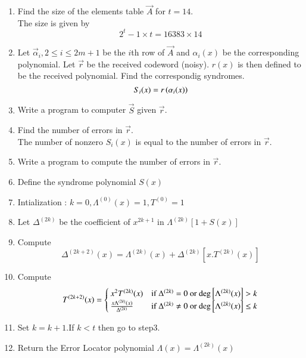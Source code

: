 \documentclass[journal,12pt,twocolumn]{IEEEtran}
\renewcommand\thesection{\arabic{section}}
\begin{document}
\begin{enumerate}[label=\thesection.\arabic*
,ref=\thesection.\theenumi]
\item Find the size of the elements table $\vec{A}$ for $t = 14$.
\\
\solution The size is given by
\begin{equation}
2^t-1 \times t = 16383 \times 14
\end{equation}
\item Let $\vec{\alpha}_i, 2 \le i \le 2m+1$ be the $i$th row of $\vec{A}$ and $\alpha_i(x)$ be the
corresponding polynomial. Let $\vec{r}$ be the received codeword (noisy). $r(x)$ is then defined to be the 
received polynomial. Find the correspondig syndromes. 
\\
\solution
\begin{equation}
S_i(x) = r\left(\alpha_i(x)\right)
\end{equation}
\item Write a program to computer $\vec{S}$ given $\vec{r}$.
\item Find the number of errors in $\vec{r}$.
\\
\solution The number of nonzero $S_i(x)$ is equal to the number of errors in $\vec{r}$.
\item Write a program to compute the number of errors in $\vec{r}$.
\item Define the syndrome polynomial $S(x)$
\item Intialization : $k=0, \Lambda^{(0)}(x)=1,T^{(0)}=1$
\item Let $\Delta^{(2k)}$ be the coefficient of $x^{2k+1}$ in $\Lambda^{(2k)}[1+S(x)]$ 
\item Compute  
\begin{equation}
\Delta^{(2k+2)}(x)=\Lambda^{(2k)}(x) +\Delta^{(2k)}[x.T^{(2k)}(x)]
\end{equation}
\item Compute \begin{equation}
    	T^{(2k+2)}(x) =
    \begin{cases}
    	x^2T^{(2k)}(x) & \text{if $\Delta^{(2k)}=0$ or deg}{}\left[\Lambda^{(2k)}(x)\right]>k\\
      \frac{x \Lambda^{(2k)}(x)}{\Delta^{(2k)}} & \text{if $\Delta^{(2k)}\neq 0$ or 
deg}{}\left[\Lambda^{(2k)}(x)\right]\leq k
    \end{cases}
  \end{equation}
\item Set $k=k+1$.If $k<t$ then go to step3.
\item Return the Error Locator polynomial $\Lambda(x)=\Lambda^{(2k)}(x)$
\end{enumerate}
\end{document}
